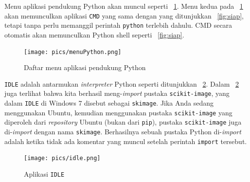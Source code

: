 Menu aplikasi pendukung Python akan muncul seperti \figurename~\ref{fig:menu}. Menu kedua pada \figurename~\ref{fig:menu} akan memunculkan aplikasi \texttt{CMD} yang sama dengan yang ditunjukkan \figurename~\ref{fig:siap}, tetapi tanpa perlu memanggil perintah \texttt{python} terlebih dahulu. CMD secara otomatis akan memunculkan Python shell seperti \figurename~\ref{fig:siap}.

\begin{figure}[h!]
  \begin{center}
    \texttt{[image: pics/menuPython.png]}
    \caption{Daftar menu aplikasi pendukung Python}
    \label{fig:menu}
  \end{center}
\end{figure}

\texttt{IDLE} adalah antarmukan \textit{interpreter} Python seperti ditunjukkan \figurename~\ref{fig:idle}. Dalam \figurename~\ref{fig:idle} juga terlihat bahwa kita berhasil meng-\textit{import} pustaka \texttt{scikit-image}, yang dalam \texttt{IDLE} di Windows 7 disebut sebagai \texttt{skimage}. Jika Anda sedang menggunakan Ubuntu, kemudian menggunakan pustaka \texttt{scikit-image} yang diperoleh dari \textit{repository} Ubuntu (bukan dari \texttt{pip}), pustaka \texttt{scikit-image} juga di-\textit{import} dengan nama \texttt{skimage}. Berhasilnya sebuah pustaka Python di-\textit{import} adalah ketika tidak ada komentar yang muncul setelah perintah \texttt{import} tersebut.

\begin{figure}
  \begin{center}
    \texttt{[image: pics/idle.png]}
    \caption{Aplikasi \texttt{IDLE}}
    \label{fig:idle}
  \end{center}
\end{figure}
